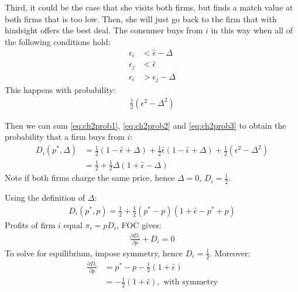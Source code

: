 \documentclass[12pt]{article}
\numberwithin{equation}{section}
\newcommand{\1}[1]{\,\mathbb{1}_{#1}} %
\begin{document}
Third, it could be the case that she visits both firms, but finds a match value at both
firms that is too low. Then, she will just go back to the firm that with hindsight offers
the best deal. The consumer buys from $i$ in this way when all of the
following conditions hold:
\begin{align}
	\epsilon_i & <\hat\epsilon-\Delta \\
	\epsilon_j & <\hat\epsilon        \\
	\epsilon_i & >\epsilon_j-\Delta
\end{align}
This happens with probability:
\begin{align}
	\frac{1}{2}(\epsilon^2-\Delta^2)
	\label{eq:ch2prob3}
\end{align}

Then we can sum \ref{eq:ch2prob1}, \ref{eq:ch2prob2} and
\ref{eq:ch2prob3} to obtain the probability that a firm buys from $i$:
\begin{align}
	D_i(p^*,\Delta) & =
	\frac{1}{2}(1-\hat\epsilon+\Delta)+
	\frac{1}{2}\hat\epsilon(1-\hat\epsilon+\Delta)+
	\frac{1}{2}(\epsilon^2-\Delta^2)                                         \\
	                & = \frac{1}{2}+\frac{1}{2}\Delta(1+\hat\epsilon-\Delta)
\end{align}
Note if both firms charge the same price, hence $\Delta=0$,
$D_i=\frac{1}{2}$.

Using the definition of $\Delta$:
\begin{align}
	D_i(p^*,p)=\frac{1}{2}+\frac{1}{2}(p^*-p)(1+\hat\epsilon-p^*+p)
\end{align}
Profits of firm $i$ equal $\pi_i=pD_i$, FOC gives:
\begin{align}
	\frac{\partial D_i}{\partial p}+D_i=0
\end{align}
To solve for equilibrium, impose symmetry, hence $D_i=\frac{1}{2}$.
Moreover:
\begin{align}
	\frac{\partial D_i}{\partial p} & =p^*-p-\frac{1}{2}(1+\hat\epsilon)                  \\
	                                & =-\frac{1}{2}(1+\hat\epsilon),\text{ with symmetry}
\end{align}
\end{document}
